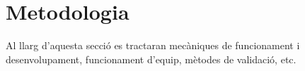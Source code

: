 \section{Metodologia}
\label{gestio:metodologia}
Al llarg d'aquesta secció es tractaran mecàniques de funcionament i desenvolupament, funcionament d'equip, mètodes de validació, etc.




